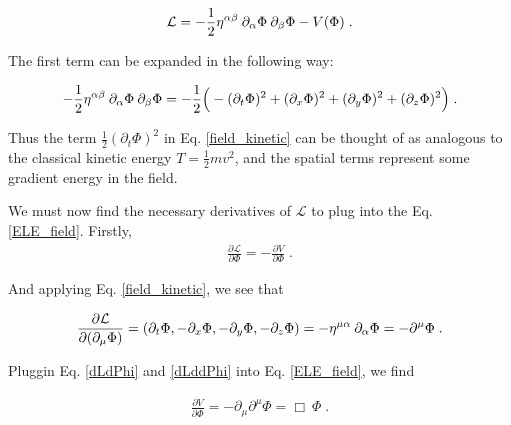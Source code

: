 \documentclass[10pt]{article}
\begin{document}
               	\begin{align}\label{field_Ldensity}
               	\mathcal{L} = -\frac{1}{2}\tensor{\eta}{^\alpha^\beta} \: \partial_\alpha \Phi \: \partial_\beta \Phi - V(\Phi) \; .
               	\end{align}
               	 
               	 The first term can be expanded in the following way: 
               	 
               	 \begin{align}\label{field_kinetic}
               	     -\frac{1}{2}\tensor{\eta}{^\alpha^\beta} \: \partial_\alpha \Phi \: \partial_\beta \Phi = -\frac{1}{2} \Big( -(\partial_t \Phi)^2 + (\partial_x \Phi)^2 + (\partial_y \Phi)^2 + (\partial_z \Phi)^2 \Big) \; .
               	 \end{align}
               	 
               	 Thus the term $\frac{1}{2} (\partial_t \Phi)^2$ in Eq. \ref{field_kinetic} can be thought of as analogous to the classical kinetic energy $T = \frac{1}{2} mv^2$, and the spatial terms represent some gradient energy in the field.
               	 
               	 We must now find the necessary derivatives of $\mathcal{L}$ to plug into the Eq. \ref{ELE_field}. Firstly, 
               	 \begin{align}\label{dLdPhi}
               	 \frac{\partial \mathcal{L}}{\partial \Phi} = -\frac{\partial V}{\partial \Phi} \; .
               	 \end{align}
               	 
               	 And applying Eq. \ref{field_kinetic}, we see that
               	 
               	 \begin{align}\label{dLddPhi}
               	     \frac{\partial \mathcal{L}}{\partial (\partial_\mu \Phi)} = (\partial_t \Phi,-\partial_x \Phi,-\partial_y \Phi,-\partial_z \Phi) = -\tensor{\eta}{^\mu^\alpha} \: \partial_\alpha \Phi = -\partial^\mu \Phi \; .
               	 \end{align}
               	 
               	 Pluggin Eq. \ref{dLdPhi} and \ref{dLddPhi}  into Eq. \ref{ELE_field}, we find
               	 
               	 \begin{align}\label{ELE_solve}
               	 \frac{\partial V}{\partial \Phi} = -\partial_\mu \partial^\mu \Phi = \Box \: \Phi \; .
               	 \end{align}
               	 
\end{document}
